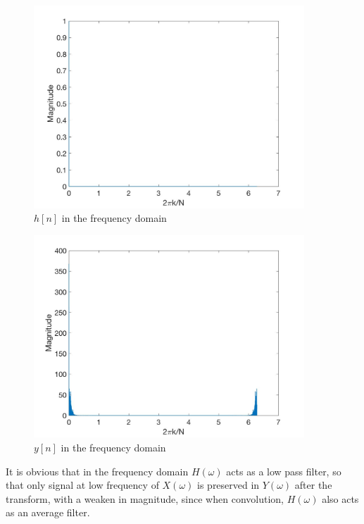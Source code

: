 \documentclass[a4paper]{article}
\begin{document}
\begin{spacing}{2.0}
\begin{figure}[H]
\centering
\includegraphics[width=4in]{Q4H.jpg}
\caption{$h[n]$ in the frequency domain}
\label{fig:graph}
\end{figure}

\begin{figure}[H]
\centering
\includegraphics[width=4in]{Q4Y.jpg}
\caption{$y[n]$ in the frequency domain}
\label{fig:graph}
\end{figure}
It is obvious that in the frequency domain $H(\omega)$ acts as a low pass filter, so that only signal at low frequency of $X(\omega)$ is preserved in $Y(\omega)$ after the transform, with a weaken in magnitude, since when convolution, $H(\omega)$ also acts as an average filter. 



\end{spacing}
\end{document}
